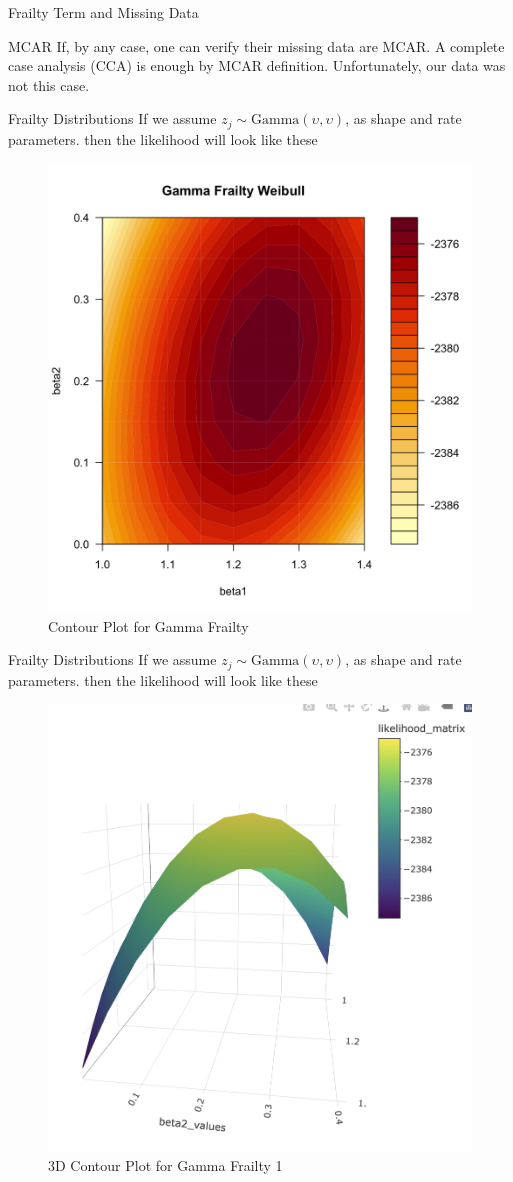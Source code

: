 \documentclass [aspectratio=169]{beamer}
\begin{document}
\begin{frame}{Frailty Term and Missing Data} 
    \begin{block}{MCAR} 
        If, by any case, one can verify their missing data are MCAR. 
        A complete case analysis (CCA) is enough by MCAR definition. 
        Unfortunately, our data was not this case. 
    \end{block}
\end{frame}

\begin{frame}{Frailty Distributions}
    If we assume $z_j\sim\text{Gamma}(\upsilon, \upsilon)$, as shape and rate parameters. then the likelihood will look like these
    \begin{figure}[!htb]
        \centering
        \includegraphics[width=0.5\linewidth]{figures/gamma contour.png}
        \caption{Contour Plot for Gamma Frailty}
    \end{figure}
\end{frame}

\begin{frame}{Frailty Distributions}
    If we assume $z_j\sim\text{Gamma}(\upsilon, \upsilon)$, as shape and rate parameters. then the likelihood will look like these
    \begin{figure}[!htb]
        \centering
        \includegraphics[width=0.5\linewidth]{figures/GAMMA 3D 1.png}
        \caption{3D Contour Plot for Gamma Frailty 1}
    \end{figure}
\end{frame}
\end{document}
